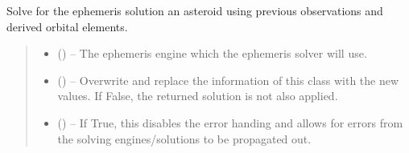 \documentclass[letterpaper,11pt,english]{sphinxmanual}
\begin{document}
\begin{savenotes}
\begin{fulllineitems}
\begin{savenotes}\begin{fulllineitems}
\label{\detokenize{code/opihiexarata.opihi.solution:opihiexarata.opihi.solution.OpihiSolution.solve_ephemeris}}
\pysigstartsignatures
{}
\pysigstopsignatures
\sphinxAtStartPar
Solve for the ephemeris solution an asteroid using previous
observations and derived orbital elements.
\begin{quote}\begin{description}
\begin{itemize}
\item {} 
\sphinxAtStartPar
{} ({\hyperref[\detokenize{code/opihiexarata.library.engine:opihiexarata.library.engine.EphemerisEngine}]{}}) – The ephemeris engine which the ephemeris solver will use.

\item {} 
\sphinxAtStartPar
{} (\sphinxstyleliteralemphasis{\sphinxupquote{, }}) – Overwrite and replace the information of this class with the new
values. If False, the returned solution is not also applied.

\item {} 
\sphinxAtStartPar
{} (\sphinxstyleliteralemphasis{\sphinxupquote{, }}) – If True, this disables the error handing and allows for errors from
the solving engines/solutions to be propagated out.


\end{itemize}
\end{description}
\end{quote}
\end{fulllineitems}
\end{savenotes}
\end{fulllineitems}
\end{savenotes}
\end{document}
